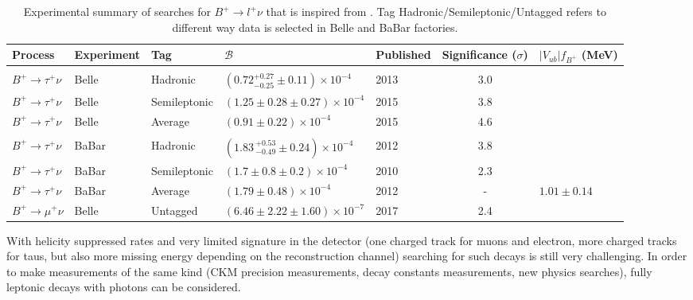 \begin{table}[ht]
\begin{center}
\begin{tabular}{ l l l l H c H} \toprule
        Process &Experiment & Tag &${\mathcal{B}}$ & Published & Significance ($\sigma$) & {$|V_{ub}|f_{B^+}$ (MeV)} \hfill\\
\hline\\[-2.5ex]
        $B^{+}\rightarrow \tau^{+}\nu$  &Belle~\cite{Adachi:2012mm}&Hadronic&$(0.72^{+0.27}_{-0.25}\pm0.11)\times10^{-4}$  & 2013 & 3.0 \\
        $B^{+}\rightarrow \tau^{+}\nu$  &Belle~\cite{Kronenbitter:2015kls}&Semileptonic&$(1.25\pm0.28\pm0.27)\times10^{-4}$ & 2015 & 3.8 \\
        $B^{+}\rightarrow \tau^{+}\nu$  &Belle~\cite{Kronenbitter:2015kls}&Average&$(0.91 \pm 0.22)\times10^{-4}$ & 2015 & 4.6 \\\hline\\[-2.5ex]
        $B^{+}\rightarrow \tau^{+}\nu$  &BaBar~\cite{Lees:2012ju} & Hadronic & $(1.83\,^{+0.53}_{-0.49}\pm0.24)\times10^{-4}$ & 2012 & 3.8 \\
        $B^{+}\rightarrow \tau^{+}\nu$  &BaBar~\cite{Aubert:2009wt} & Semileptonic & $(1.7\pm 0.8\pm 0.2)\times10^{-4}$ & 2010 & 2.3\\
        $B^{+}\rightarrow \tau^{+}\nu$  &BaBar~\cite{Lees:2012ju} & Average & $(1.79 \pm 0.48)\times 10^{-4}$ & 2012 & - & $1.01\pm 0.14$  \\ \hline
$B^{+}\rightarrow \mu^{+}\nu$ & Belle~\cite{Sibidanov:2017vph} & Untagged& $(6.46\pm2.22\pm 1.60)\times 10^{-7}$ & 2017 & 2.4 &\\
\bottomrule
\end{tabular}
\end{center}
\caption{Experimental summary of searches for $B^{+}\rightarrow l^{+}\nu$ that is inspired from \cite{Patrignani:2016xqp}. Tag Hadronic/Semileptonic/Untagged refers to different way data is selected in Belle and BaBar factories.}
\label{tab:sum}
\end{table}




With helicity suppressed rates and very limited signature in the detector (one charged track for muons and electron, more charged tracks for taus, but also more missing energy depending on the reconstruction channel) searching for such decays is still very challenging. In order to make measurements of the same kind (CKM precision measurements, decay constants measurements, new physics searches), fully leptonic decays with photons can be considered.   

